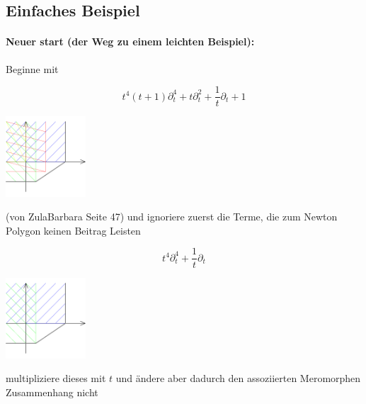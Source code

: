 \subsection{Einfaches Beispiel}
\paragraph{Neuer start (der Weg zu einem leichten Beispiel):}
Beginne mit

\begin{minipage}[hbt]{0,49\textwidth}
  \[ t^4(t+1)\partial_t^4 + t\partial_t^2+\frac{1}{t}\partial_t+1 \]
\end{minipage}
\begin{minipage}[hbt]{0,49\textwidth}
  \begin{center}
    \includegraphics[width=3cm]{beispiele/img/e.png}
  \end{center}
\end{minipage}

(von ZulaBarbara Seite 47)
und ignoriere zuerst die Terme, die zum Newton Polygon keinen Beitrag Leisten

\begin{minipage}[hbt]{0,49\textwidth}
  \[ t^4\partial_t^4 +\frac{1}{t}\partial_t \]
\end{minipage}
\begin{minipage}[hbt]{0,49\textwidth}
  \begin{center}
    \includegraphics[width=3cm]{beispiele/img/bar_e.png}
  \end{center}
\end{minipage}

multipliziere dieses mit $t$ und ändere aber dadurch den assoziierten
Meromorphen Zusammenhang nicht \cite[Chapter 5.1]{sabbah_cimpa90}

